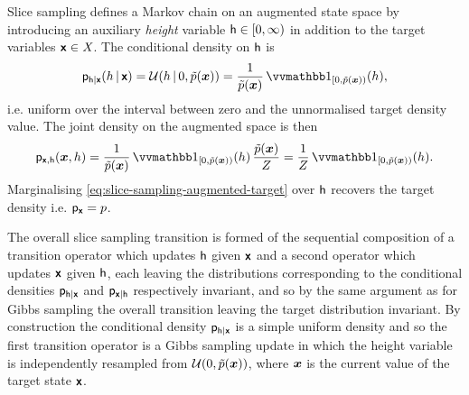 Slice sampling defines a Markov chain on an augmented state space by introducing an auxiliary \emph{height} variable $\mathsf{h} \in [0, \infty)$ in addition to the target variables $\boldsymbol{\mathsf{x}} \in \mathit{X}$. The conditional density on $\mathsf{h}$ is 
\begin{equation}
  \pden{\rvar{h}|\rvct{x}}(h\gvn\rvct{x}) = 
  \mathcal{U}\lpa h\gvn 0, \utgtdens(\vct{x})\rpa = 
  \frac{1}{\utgtdens(\vct{x})} \ind{[0,\utgtdens(\vct{x}))}(h),
\end{equation}
i.e. uniform over the interval between zero and the unnormalised target density value. The joint density on the augmented space is then
\begin{equation}\label{eq:slice-sampling-augmented-target}
  \pden{\rvct{x},\rvar{h}}(\vct{x},h) = 
  \frac{1}{\utgtdens(\vct{x})} \ind{[0,\utgtdens(\vct{x}))}(h)\, \frac{\utgtdens(\vct{x})}{Z} =
  \frac{1}{Z} \ind{[0,\utgtdens(\vct{x}))}(h).
\end{equation}
Marginalising \eqref{eq:slice-sampling-augmented-target} over $\mathsf{h}$ recovers the target density i.e. $\mathsf{p}_{\boldsymbol{\mathsf{x}}} = p$. %

The overall slice sampling transition is formed of the sequential composition of a transition operator which updates $\mathsf{h}$ given $\boldsymbol{\mathsf{x}}$ and a second operator which updates $\boldsymbol{\mathsf{x}}$ given $\mathsf{h}$, each leaving the distributions corresponding to the conditional densities $\mathsf{p}_{\mathsf{h}|\boldsymbol{\mathsf{x}}}$ and $\mathsf{p}_{\boldsymbol{\mathsf{x}}|\mathsf{h}}$ respectively invariant, and so by the same argument as for Gibbs sampling the overall transition leaving the target distribution invariant. By construction the conditional density $\mathsf{p}_{\mathsf{h}|\boldsymbol{\mathsf{x}}}$ is a simple uniform density and so the first transition operator is a Gibbs sampling update in which the height variable is independently resampled from $\mathcal{U}\lpa 0, \utgtdens(\vct{x})\rpa$, where $\boldsymbol{x}$ is the current value of the target state $\boldsymbol{\mathsf{x}}$.


